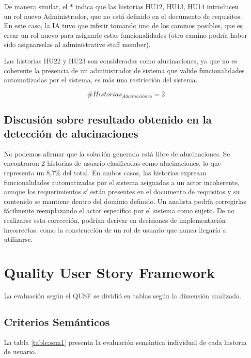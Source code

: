 De manera similar, el * indica que las historias HU12, HU13, HU14 introducen un rol nuevo Administrador, que no está definido en el documento de requisitos. En este caso, la IA tuvo que inferir tomando uno de los caminos posibles, que es crear un rol nuevo para asignarle estas funcionalidades (otro camino podría haber sido asignarselas al administrative staff member).

Las historias HU22 y HU23 son consideradas como alucinaciones, ya que no es coherente la presencia de un administrador de sistema que valide funcionalidades automatizadas por el sistema, es más una restricción del sistema.

\[\# Historias_{Alucinaciónes} = 2 \]

\subsection{Discusión sobre resultado obtenido en la detección de alucinaciones}
No podemos afirmar que la solución generada está libre de alucinaciones. Se encontraron 2 historias de usuario clasificadas como alucinaciones, lo que representa un 8,7\% del total. En ambos casos, las historias expresan funcionalidades automatizadas por el sistema asignadas a un actor incoherente, aunque los requerimientos sí están presentes en el documento de requisitos y su contenido se mantiene dentro del dominio definido. Un analista podría corregirlas fácilmente reemplazando el actor específico por el sistema como sujeto. De no realizarse esta corrección, podrían derivar en decisiones de implementación incorrectas, como la construcción de un rol de usuario que nunca llegaría a utilizarse.

\section{Quality User Story Framework}

La evaluación según el QUSF se dividió en tablas según la dimensión analizada. 

\subsection{Criterios Semánticos}

La tabla \ref{table:sem1} presenta la evaluación semántica individual de cada historia de usuario.

